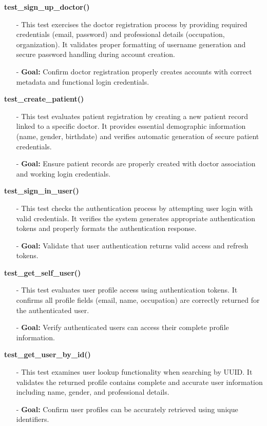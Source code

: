 \documentclass[12pt, titlepage]{article}
\begin{document}
\textbf{test\_sign\_up\_doctor()}
\begin{itemize}
    \item[-] This test exercises the doctor registration process by providing required credentials (email, password) and professional details (occupation, organization). It validates proper formatting of username generation and secure password handling during account creation.
    \item[-] \textbf{Goal:} Confirm doctor registration properly creates accounts with correct metadata and functional login credentials.
\end{itemize}

\textbf{test\_create\_patient()}
\begin{itemize}
    \item[-] This test evaluates patient registration by creating a new patient record linked to a specific doctor. It provides essential demographic information (name, gender, birthdate) and verifies automatic generation of secure patient credentials.
    \item[-] \textbf{Goal:} Ensure patient records are properly created with doctor association and working login credentials.
\end{itemize}

\textbf{test\_sign\_in\_user()}
\begin{itemize}
    \item[-] This test checks the authentication process by attempting user login with valid credentials. It verifies the system generates appropriate authentication tokens and properly formats the authentication response.
    \item[-] \textbf{Goal:} Validate that user authentication returns valid access and refresh tokens.
\end{itemize}

\textbf{test\_get\_self\_user()}
\begin{itemize}
    \item[-] This test evaluates user profile access using authentication tokens. It confirms all profile fields (email, name, occupation) are correctly returned for the authenticated user.
    \item[-] \textbf{Goal:} Verify authenticated users can access their complete profile information.
\end{itemize}

\textbf{test\_get\_user\_by\_id()}
\begin{itemize}
    \item[-] This test examines user lookup functionality when searching by UUID. It validates the returned profile contains complete and accurate user information including name, gender, and professional details.
    \item[-] \textbf{Goal:} Confirm user profiles can be accurately retrieved using unique identifiers.
\end{itemize}
\end{document}
